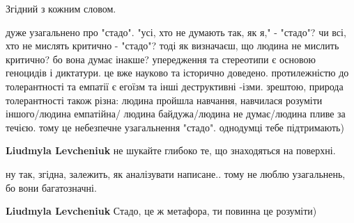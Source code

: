 \begin{itemize}
Згідний з кожним словом.

 

дуже узагальнено про "стадо". "усі, хто не думають так, як я," - "стадо"? чи
всі, хто не мислять критично - "стадо"? тоді як визначаєш, що людина не мислить
критично? бо вона думає інакше? упередження та стереотипи є основою геноцидів і
диктатури. це вже науково та історично доведено. протилежністю до толерантності
та емпатії є егоїзм та інші деструктивні -ізми. зрештою, природа толерантності
також різна: людина пройшла навчання, навчилася розуміти іншого/людина
емпатійна/ людина байдужа/людина не думає/людина пливе за течією. тому це
небезпечне узагальнення "стадо". однодумці тебе підтримають)

\begin{itemize}
 
\textbf{Liudmyla Levcheniuk} не шукайте глибоко те, що знаходяться на поверхні.

 
ну так, згідна, залежить, як аналізувати написане.. тому не люблю узагальнень, бо вони багатозначні.

 
\textbf{Liudmyla Levcheniuk} Стадо, це ж метафора, ти повинна це розуміти)
\end{itemize}

 


\end{itemize}
